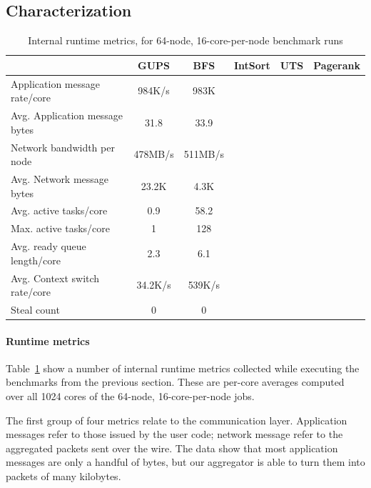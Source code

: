 \subsection{Characterization}

\begin{table}[htb]
\begin{center}
\begin{tabular}{l|c|c|c|c|c}
                               &   GUPS            &   BFS   & IntSort & UTS & Pagerank \\ \hline
Application message rate/core  & 984K/s            &  983K   &           \\
Avg. Application message bytes & 31.8              & 33.9    &       \\
Network bandwidth per node     & 478MB/s           & 511MB/s &          \\
Avg. Network message bytes     & 23.2K             & 4.3K    &     \\ \hline
Avg. active tasks/core         & 0.9               & 58.2    &    \\
Max. active tasks/core         & 1                 & 128     &     \\
Avg. ready queue length/core   & 2.3               & 6.1     &      \\
Avg. Context switch rate/core & 34.2K/s           & 539K/s  &       \\ 
Steal count                    & 0                 & 0       &       \\
\end{tabular}
\end{center}
\caption{Internal runtime metrics, for 64-node, 16-core-per-node benchmark runs}
\label{tab:grappa-metrics}
\end{table}

\paragraph{Runtime metrics}
Table~\ref{tab:grappa-metrics} show a number of internal runtime
metrics collected while executing the benchmarks from the previous
section. These are per-core averages computed over all 1024 cores of
the 64-node, 16-core-per-node jobs.

The first group of four metrics relate to the communication
layer. Application messages refer to those issued by the user code;
network message refer to the aggregated packets sent over the wire. The
data show that most application messages are only a handful of bytes,
but our aggregator is able to turn them into packets of many kilobytes.


